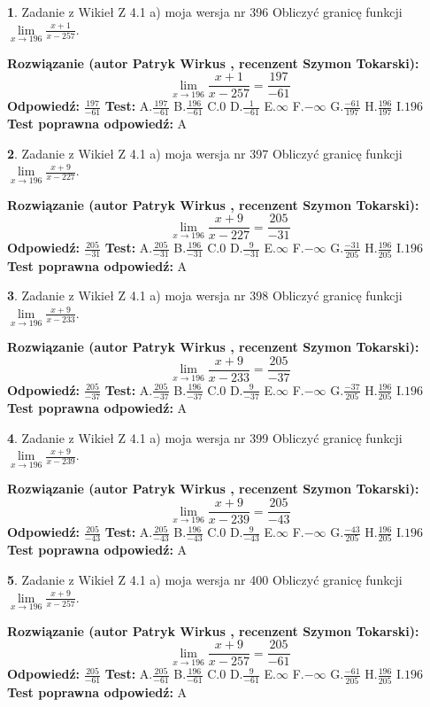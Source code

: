 \documentclass[12pt, a4paper]{article}
\theoremstyle{definition} %
\newtheorem{zad}{}
\newcommand{\zadStart}[1]{\begin{zad}#1\newline}
\newcommand{\zadStop}{\end{zad}}
\newcommand{\rozwStart}[2]{\noindent \textbf{Rozwiązanie (autor #1 , recenzent #2): }\newline}
\newcommand{\rozwStop}{\newline}
\newcommand{\odpStart}{\noindent \textbf{Odpowiedź:}\newline}
\newcommand{\odpStop}{\newline}
\newcommand{\testStart}{\noindent \textbf{Test:}\newline}
\newcommand{\testStop}{\newline}
\newcommand{\kluczStart}{\noindent \textbf{Test poprawna odpowiedź:}\newline}
\newcommand{\kluczStop}{\newline}
\begin{document}
\zadStart{Zadanie z Wikieł Z 4.1 a) moja wersja nr 396}
Obliczyć granicę funkcji $\lim\limits_{x\to196}\frac{x+1}{x-257}$.
\zadStop
\rozwStart{Patryk Wirkus}{Szymon Tokarski}
$$\lim\limits_{x\to196}\frac{x+1}{x-257} = \frac{197}{-61}$$
\rozwStop
\odpStart
$\frac{197}{-61}$
\odpStop
\testStart
A.$\frac{197}{-61}$
B.$\frac{196}{-61}$
C.$0$
D.$\frac{1}{-61}$
E.$\infty$
F.$-\infty$
G.$\frac{-61}{197}$
H.$\frac{196}{197}$
I.$196$
\testStop
\kluczStart
A
\kluczStop



\zadStart{Zadanie z Wikieł Z 4.1 a) moja wersja nr 397}
Obliczyć granicę funkcji $\lim\limits_{x\to196}\frac{x+9}{x-227}$.
\zadStop
\rozwStart{Patryk Wirkus}{Szymon Tokarski}
$$\lim\limits_{x\to196}\frac{x+9}{x-227} = \frac{205}{-31}$$
\rozwStop
\odpStart
$\frac{205}{-31}$
\odpStop
\testStart
A.$\frac{205}{-31}$
B.$\frac{196}{-31}$
C.$0$
D.$\frac{9}{-31}$
E.$\infty$
F.$-\infty$
G.$\frac{-31}{205}$
H.$\frac{196}{205}$
I.$196$
\testStop
\kluczStart
A
\kluczStop



\zadStart{Zadanie z Wikieł Z 4.1 a) moja wersja nr 398}
Obliczyć granicę funkcji $\lim\limits_{x\to196}\frac{x+9}{x-233}$.
\zadStop
\rozwStart{Patryk Wirkus}{Szymon Tokarski}
$$\lim\limits_{x\to196}\frac{x+9}{x-233} = \frac{205}{-37}$$
\rozwStop
\odpStart
$\frac{205}{-37}$
\odpStop
\testStart
A.$\frac{205}{-37}$
B.$\frac{196}{-37}$
C.$0$
D.$\frac{9}{-37}$
E.$\infty$
F.$-\infty$
G.$\frac{-37}{205}$
H.$\frac{196}{205}$
I.$196$
\testStop
\kluczStart
A
\kluczStop



\zadStart{Zadanie z Wikieł Z 4.1 a) moja wersja nr 399}
Obliczyć granicę funkcji $\lim\limits_{x\to196}\frac{x+9}{x-239}$.
\zadStop
\rozwStart{Patryk Wirkus}{Szymon Tokarski}
$$\lim\limits_{x\to196}\frac{x+9}{x-239} = \frac{205}{-43}$$
\rozwStop
\odpStart
$\frac{205}{-43}$
\odpStop
\testStart
A.$\frac{205}{-43}$
B.$\frac{196}{-43}$
C.$0$
D.$\frac{9}{-43}$
E.$\infty$
F.$-\infty$
G.$\frac{-43}{205}$
H.$\frac{196}{205}$
I.$196$
\testStop
\kluczStart
A
\kluczStop



\zadStart{Zadanie z Wikieł Z 4.1 a) moja wersja nr 400}
Obliczyć granicę funkcji $\lim\limits_{x\to196}\frac{x+9}{x-257}$.
\zadStop
\rozwStart{Patryk Wirkus}{Szymon Tokarski}
$$\lim\limits_{x\to196}\frac{x+9}{x-257} = \frac{205}{-61}$$
\rozwStop
\odpStart
$\frac{205}{-61}$
\odpStop
\testStart
A.$\frac{205}{-61}$
B.$\frac{196}{-61}$
C.$0$
D.$\frac{9}{-61}$
E.$\infty$
F.$-\infty$
G.$\frac{-61}{205}$
H.$\frac{196}{205}$
I.$196$
\testStop
\kluczStart
A
\kluczStop
\end{document}
